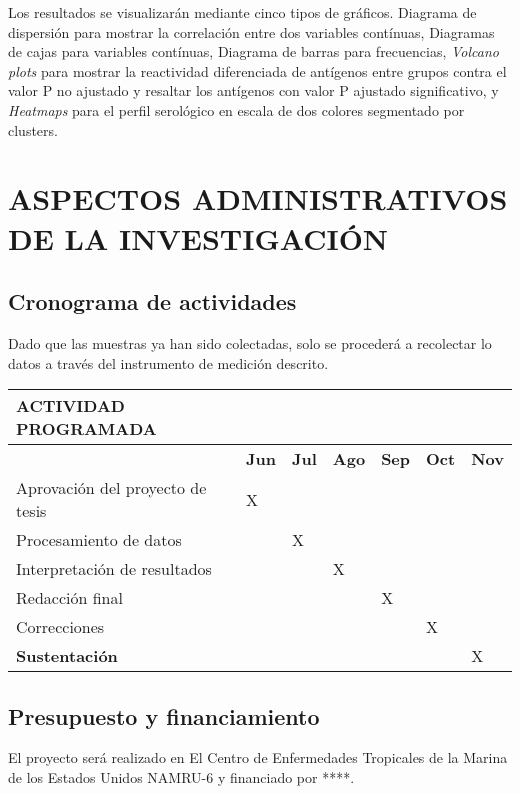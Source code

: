 \documentclass[]{article}
\begin{document}
Los resultados se visualizarán mediante cinco tipos de gráficos.
Diagrama de dispersión para mostrar la correlación entre dos variables
contínuas, Diagramas de cajas para variables contínuas, Diagrama de
barras para frecuencias, \emph{Volcano plots} para mostrar la
reactividad diferenciada de antígenos entre grupos contra el valor P no
ajustado y resaltar los antígenos con valor P ajustado significativo, y
\emph{Heatmaps} para el perfil serológico en escala de dos colores
segmentado por clusters.

\section{ASPECTOS ADMINISTRATIVOS DE LA
INVESTIGACIÓN}\label{aspectos-administrativos-de-la-investigacion}

\subsection{Cronograma de actividades}\label{cronograma-de-actividades}

Dado que las muestras ya han sido colectadas, solo se procederá a
recolectar lo datos a través del instrumento de medición descrito.

\begin{longtable}[]{@{}lllllll@{}}
\toprule
\textbf{ACTIVIDAD PROGRAMADA} & & & & & &\tabularnewline
\midrule
\endhead
& \textbf{Jun} & \textbf{Jul} & \textbf{Ago} & \textbf{Sep} &
\textbf{Oct} & \textbf{Nov}\tabularnewline
Aprovación del proyecto de tesis & X & & & & &\tabularnewline
Procesamiento de datos & & X & & & &\tabularnewline
Interpretación de resultados & & & X & & &\tabularnewline
Redacción final & & & & X & &\tabularnewline
Correcciones & & & & & X &\tabularnewline
\textbf{Sustentación} & & & & & & X\tabularnewline
\bottomrule
\end{longtable}

\subsection{Presupuesto y
financiamiento}\label{presupuesto-y-financiamiento}

El proyecto será realizado en El Centro de Enfermedades Tropicales de la
Marina de los Estados Unidos NAMRU-6 y financiado por ****.
\end{document}
